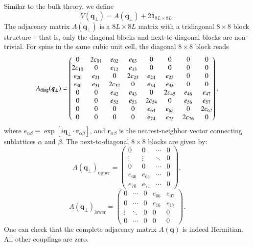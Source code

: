 \documentclass[aps,prx,reprint,runinaddress,superscriptaddress,amsmath,amssymb,floatfix,longbibliography]{revtex4-1}
\renewcommand{\vec}[1]{\boldsymbol{#1}}
\newcommand{\mat}[1]{#1}
\newcommand{\matone}{\vec{1}}
\begin{document}
Similar to the bulk theory, we define
\begin{equation}
	\mat{V}(\vec{q}_\perp) = \mat{A}(\vec{q}_\perp) + 2\matone_{8 L \times 8 L} .
\end{equation}
The adjacency matrix $A(\vec{q}_\perp)$ is a $8 L \times 8 L$ matrix with a tridiagonal $8 \times 8$ block structure -- that is, only the diagonal blocks and next-to-diagonal blocks are non-trivial. For spins in the same cubic unit cell, the diagonal $8 \times 8$ block reads
\begin{align}
	\mat{A}_{\rm diag}(\vec{q}_\perp) = \begin{pmatrix}
	0       & 2c_{01} & e_{02}     & e_{03}     & 0     & 0     & 0     & 0 \\
	2c_{10} & 0     & e_{12}     & e_{13}     & 0     & 0     & 0     & 0 \\
	e_{20}  & e_{21}     & 0     & 2c_{23} & e_{24}     & e_{25}     & 0     & 0 \\
	e_{30}  & e_{31}     & 2c_{32} & 0     & e_{34}     & e_{35}     & 0     & 0 \\
	0     & 0     & e_{42}     & e_{43}     & 0     & 2c_{45} & e_{46}     & e_{47} \\
	0     & 0     & e_{52}     & e_{53}     & 2c_{54} & 0     & e_{56}     & e_{57} \\
	0     & 0     & 0     & 0     & e_{64}     & e_{65}     & 0     & 2c_{67} \\
	0     & 0     & 0     & 0     & e_{74}     & e_{75}     & 2c_{76} & 0  
	\end{pmatrix} ,
\end{align}
where $e_{\alpha \beta} \equiv \exp [i \vec{q}_\perp \cdot \vec{r}_{\alpha \beta}]$, and $\vec{r}_{\alpha \beta}$ is the nearest-neighbor vector connecting sublattices $\alpha$ and $\beta$. The next-to-diagonal $ 8 \times 8$ blocks are given by:   
\begin{equation}
	\mat{A}(\vec{q}_\perp)_\text{upper} = \begin{pmatrix}
	0 & 0 &\cdots & 0 \\
	\vdots & \vdots & \ddots & 0 \\
    0 & 0 &\cdots &  0 \\
	e_{60} & e_{61} &\cdots & 0  \\
    e_{70} & e_{71} &\cdots & 0 
	\end{pmatrix} ,
\end{equation}
\begin{equation}
	\mat{A}(\vec{q}_\perp)_\text{lower} = \begin{pmatrix}
	0 & \cdots & 0 & e_{06} & e_{07} \\
	0 & \cdots & 0 & e_{16} & e_{17} \\
	\vdots & \ddots & 0 & 0 & 0 \\
	0 & \cdots & 0 & 0 & 0 
	\end{pmatrix}.
\end{equation}
One can check that the complete adjacency matrix $A(\vec{q})$ is indeed Hermitian. All other couplings are zero.
\end{document}
